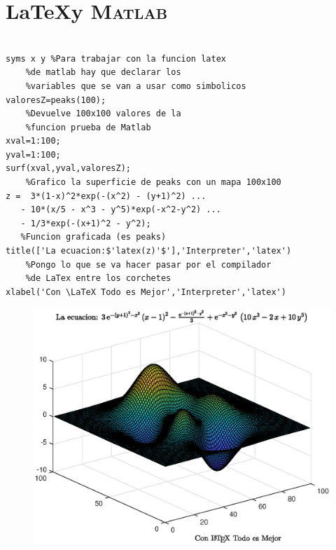 \documentclass[11pt, a4paper,titlepage]{article}
\begin{document}
\section{\LaTeX\space y {\scshape Matlab}}
\begin{code}
\begin{verbatim}

syms x y %Para trabajar con la funcion latex 
    %de matlab hay que declarar los
    %variables que se van a usar como simbolicos
valoresZ=peaks(100); 
    %Devuelve 100x100 valores de la
    %funcion prueba de Matlab
xval=1:100;
yval=1:100;
surf(xval,yval,valoresZ); 
    %Grafico la superficie de peaks con un mapa 100x100
z =  3*(1-x)^2*exp(-(x^2) - (y+1)^2) ... 
   - 10*(x/5 - x^3 - y^5)*exp(-x^2-y^2) ... 
   - 1/3*exp(-(x+1)^2 - y^2); 
   %Funcion graficada (es peaks)
title(['La ecuacion:$'latex(z)'$'],'Interpreter','latex')
    %Pongo lo que se va hacer pasar por el compilador
    %de LaTex entre los corchetes
xlabel('Con \LaTeX Todo es Mejor','Interpreter','latex')
\end{verbatim}
\end{code}
\begin{figure}[h]
\centering
\includegraphics[width=\textwidth]{graf/g6.eps}
\end{figure}


\end{document}
